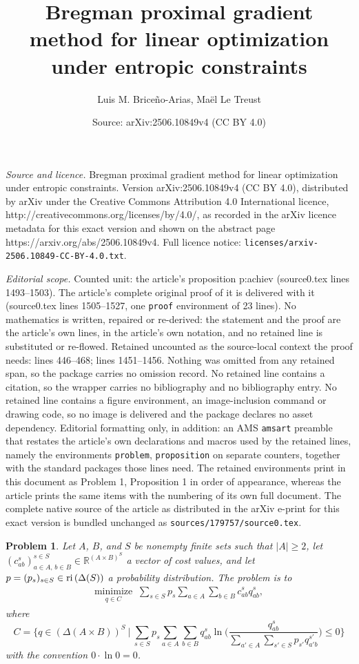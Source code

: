 \documentclass[10pt,a4paper]{amsart}
\title{Bregman proximal gradient method for linear optimization under entropic constraints}
\author{Luis M. Brice\~no-Arias, Ma\"el Le Treust}
\date{Source: arXiv:2506.10849v4 (CC BY 4.0)}
\newtheorem{problem}{Problem}
\newcommand{\Menge}[2]{\bigg\{{#1}~\bigg|~{#2}\bigg\}}
\newcommand{\R}{{\mathbb R}}
\newcommand{\minimize}[2]{\ensuremath{\underset{\substack{{#1}}}%
{\mathrm{minimize}}\;\;#2 }}
\newcommand{\reli}{\ensuremath{\text{\rm ri}\,}}
\begin{document}
\maketitle

\noindent\emph{Source and licence.} Bregman proximal gradient method for linear optimization under entropic constraints. Version arXiv:2506.10849v4 (CC BY 4.0), distributed by arXiv under the Creative Commons Attribution 4.0 International licence, http://creativecommons.org/licenses/by/4.0/, as recorded in the arXiv licence metadata for this exact version and shown on the abstract page https://arxiv.org/abs/2506.10849v4. Full licence notice: \texttt{licenses/arxiv-2506.10849-CC-BY-4.0.txt}.\par\smallskip

\noindent\textit{Editorial scope.} Counted unit: the article's proposition p:achiev (source0.tex lines 1493--1503). The article's complete original proof of it is delivered with it (source0.tex lines 1505--1527, one \texttt{proof} environment of 23 lines). No mathematics is written, repaired or re-derived: the statement and the proof are the article's own lines, in the article's own notation, and no retained line is substituted or re-flowed.  Retained uncounted as the source-local context the proof needs: lines 446--468; lines 1451--1456.  Nothing was omitted from any retained span, so the package carries no omission record.  No retained line contains a citation, so the wrapper carries no bibliography and no bibliography entry.  No retained line contains a figure environment, an image-inclusion command or drawing code, so no image is delivered and the package declares no asset dependency.  Editorial formatting only, in addition: an AMS \texttt{amsart} preamble that restates the article's own declarations and macros used by the retained lines, namely the environments \texttt{problem}, \texttt{proposition} on separate counters, together with the standard packages those lines need.  The retained environments print in this document as Problem 1, Proposition 1 in order of appearance, whereas the article prints the same items with the numbering of its own full document.  The complete native source of the article as distributed in the arXiv e-print for this exact version is bundled unchanged as \texttt{sources/179757/source0.tex}.
\begin{problem}\label{prob:main}
Let $A$, $B$, and $S$ be nonempty finite sets such that $|A|\ge 
2$, let $(c_{ab}^s)_{a\in A,\, b\in B}^{s\in S}\in \R^{(A\times 
B)^S}$ a vector of cost values, and let $p=(p_s)_{s\in 
S}\in{\reli(\Delta(S))}$ a probability distribution. 
The problem is to
\begin{align}
\label{e:PrimalProblem}
\minimize{q\in C}{\sum_{s\in 
S}p_s\sum_{a\in A}\sum_{b\in B}c_{ab}^sq_{ab}^s},
\end{align}
where 
\begin{equation}
\label{e:defC}
C=\Menge{q\in(\Delta(A\times 
B))^S}{\sum_{s\in 
S}p_s\sum_{a\in A}\sum_{b\in B}q_{ab}^s\ln 
\Bigg(\frac{q_{ab}^s}{\sum\limits_{a'\in A}\sum\limits_{s'\in 
S}p_{s'}q_{a'b}^{s'}}\Bigg)\leq 
0}
\end{equation}
with the convention $0\cdot\ln 0=0$.
\end{problem}
\end{document}
